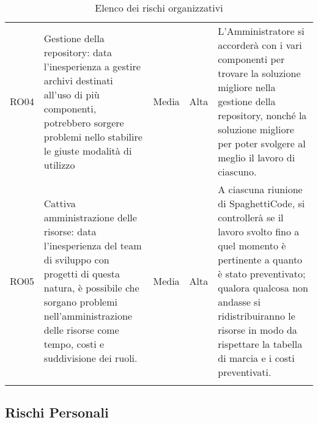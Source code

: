 \documentclass[../piano_di_progetto.tex]{subfiles}
\begin{document}
\begin{center}
\begin{longtable}{|c|p{4.5cm}|c|c|p{4.5cm}|}
		RO04 		& 
		Gestione della repository: data l'inesperienza a gestire archivi destinati all'uso di più componenti, potrebbero sorgere problemi nello stabilire le giuste modalità di utilizzo & 
		Media 		& 
		Alta 		& 
		L’Amministratore si accorderà con i vari componenti per trovare la soluzione migliore nella gestione della repository, nonché la soluzione migliore per poter svolgere al meglio il lavoro di ciascuno. \\

		RO05 		& 
		Cattiva amministrazione delle risorse: data l’inesperienza del team di sviluppo con progetti di questa natura, è possibile che sorgano problemi nell’amministrazione delle risorse come tempo, costi e suddivisione dei ruoli.  & 
		Media 		& 
		Alta 		& 
		A ciascuna riunione di SpaghettiCode, si controllerà se il lavoro svolto fino a quel momento è pertinente a quanto è stato preventivato; qualora qualcosa non andasse si ridistribuiranno le risorse in modo da rispettare la tabella di marcia e i costi preventivati.\\

		\hline
		\rowcolor{white}
		\caption{Elenco dei rischi organizzativi}
	\end{longtable}

\end{center}


\subsection{Rischi Personali}%
\label{sub:rischi_pers}
\end{document}
